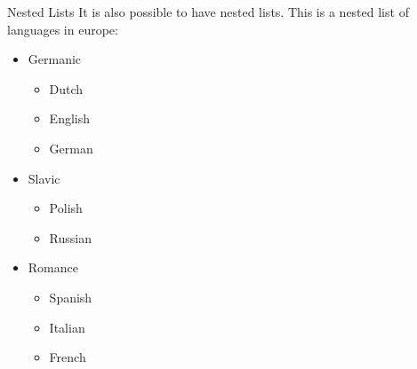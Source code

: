 \begin{frame}[fragile]{Nested Lists}
It is also possible to have nested lists. This is a nested list of languages in europe:
\begin{itemize}[label=\textbullet]
\item Germanic
\begin{itemize}[label=\textbullet]
\item Dutch
\item English
\item German
\end{itemize}
\item Slavic
\begin{itemize}[label=\textbullet]
\item Polish
\item Russian
\end{itemize}
\item Romance
\begin{itemize}[label=\textbullet]
\item Spanish
\item Italian
\item French
\end{itemize}
\end{itemize}

\end{frame}
